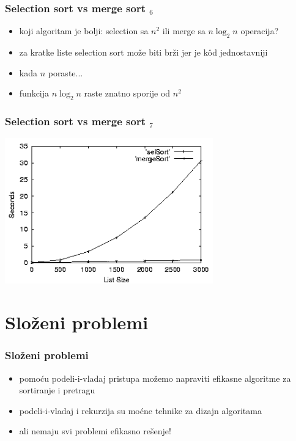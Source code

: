 \documentclass[utf8,compress]{beamer}
\begin{document}
\begin{frame}[fragile]
  \frametitle{Selection sort vs merge sort $_6$}
  \begin{itemize}
    \item koji algoritam je bolji: selection sa $n^2$ ili merge sa $n\log_2 n$ operacija?
    \item za kratke liste selection sort može biti brži jer je kôd jednostavniji
    \item kada $n$ poraste...
    \item funkcija $n\log_2 n$ raste znatno sporije od $n^2$
  \end{itemize}
\end{frame}

\begin{frame}[fragile]
  \frametitle{Selection sort vs merge sort $_7$}
\begin{center}
  \includegraphics[width=9cm]{pic29}
\end{center}
\end{frame}

\section{Složeni problemi}

\begin{frame}[fragile]
  \frametitle{Složeni problemi}
  \begin{itemize}
    \item pomoću podeli-i-vladaj pristupa možemo napraviti efikasne algoritme za sortiranje i pretragu
    \item podeli-i-vladaj i rekurzija su moćne tehnike za dizajn algoritama
    \item ali nemaju svi problemi efikasno rešenje!
  \end{itemize}
\end{frame}
\end{document}
